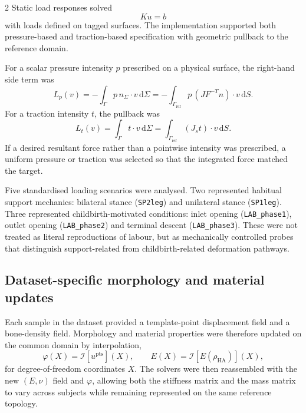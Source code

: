 \documentclass[openacc]{rsproca_new}
\begin{document}
\begin{multicols}{2}
Static load responses solved
\begin{equation}
Ku=b
\end{equation}
with loads defined on tagged surfaces. The implementation supported both pressure-based and traction-based specification with geometric pullback to the reference domain.

For a scalar pressure intensity $p$ prescribed on a physical surface, the right-hand side term was
\begin{equation}
L_{p}(v)=-\int_{\Gamma} p\,n_{\Sigma}\cdot v\,\mathrm{d}\Sigma
       =-\int_{\Gamma_{\mathrm{ref}}} p\,(J F^{-T} n)\cdot v\,\mathrm{d}S.
\end{equation}
For a traction intensity $t$, the pullback was
\begin{equation}
L_{t}(v)=\int_{\Gamma} t\cdot v\,\mathrm{d}\Sigma
       =\int_{\Gamma_{\mathrm{ref}}}(J_{s}t)\cdot v\,\mathrm{d}S.
\end{equation}
If a desired resultant force rather than a pointwise intensity was prescribed, a uniform pressure or traction was selected so that the integrated force matched the target.

Five standardised loading scenarios were analysed. Two represented habitual support mechanics: bilateral stance (\texttt{SP2leg}) and unilateral stance (\texttt{SP1leg}). Three represented childbirth-motivated conditions: inlet opening (\texttt{LAB\_phase1}), outlet opening (\texttt{LAB\_phase2}) and terminal descent (\texttt{LAB\_phase3}). These were not treated as literal reproductions of labour, but as mechanically controlled probes that distinguish support-related from childbirth-related deformation pathways.

\subsection{Dataset-specific morphology and material updates}

Each sample in the dataset provided a template-point displacement field and a bone-density field. Morphology and material properties were therefore updated on the common domain by interpolation,
\begin{equation}
\varphi(X)=\mathcal{I}[u^{\mathrm{pts}}](X), \qquad
E(X)=\mathcal{I}[E(\rho_{\mathrm{HA}})](X),
\end{equation}
for degree-of-freedom coordinates $X$. The solvers were then reassembled with the new $(E,\nu)$ field and $\varphi$, allowing both the stiffness matrix and the mass matrix to vary across subjects while remaining represented on the same reference topology.


\end{multicols}
\end{document}
